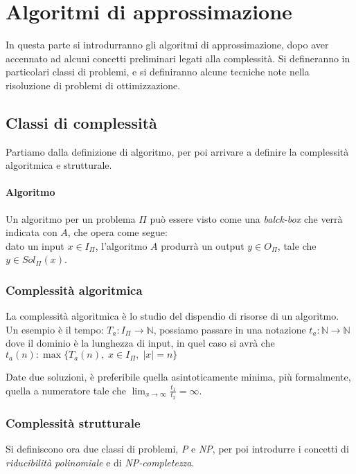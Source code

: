 \section{Algoritmi di approssimazione}
In questa parte si introdurranno gli algoritmi di approssimazione, 
dopo aver accennato ad alcuni concetti preliminari legati alla complessità.
Si defineranno in particolari classi di problemi, e si definiranno alcune 
tecniche note nella risoluzione di problemi di ottimizzazione.

\subsection{Classi di complessità}
Partiamo dalla definizione di algoritmo, per poi arrivare a definire la 
complessità algoritmica e strutturale.

\paragraph{Algoritmo}
Un algoritmo per un problema $\Pi$ può essere visto come una \emph{balck-box}
che verrà indicata con $A$, che opera come segue: \\
dato un input $x \in I_{\Pi}$, l'algoritmo $A$ produrrà un output 
$y \in O_{\Pi}$, tale che $y \in Sol_{\Pi}(x)$.

\subsubsection{Complessità algoritmica}
La complessità algoritmica è lo studio del dispendio di risorse di 
un algoritmo.\\
Un esempio è il tempo: $T_a : I_\Pi \rightarrow \mathbb{N}$, possiamo passare
in una notazione $t_a : \mathbb{N} \rightarrow \mathbb{N}$ dove il dominio è 
la lunghezza di input, in quel caso si avrà che $t_a(n) : \max\{ T_a(n),\; x \in I_{\Pi},\; |x| = n\}$

Date due soluzioni, è preferibile quella asintoticamente minima, 
più formalmente, quella a numeratore tale che $\lim_{x \to \infty} \frac{t_1}{t_2} = \infty $.

\subsubsection{Complessità strutturale}
Si definiscono ora due classi di problemi, \emph{P} e \emph{NP}, per 
poi introdurre i concetti di \emph{riducibilità polinomiale} e di \emph{NP-completezza}.

